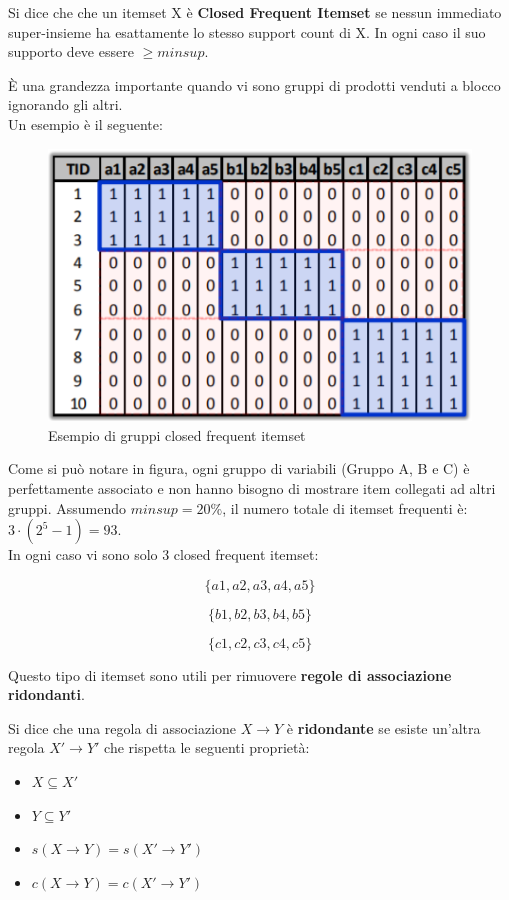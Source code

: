 \begin{defn}
	Si dice che che un itemset X è \textbf{Closed Frequent Itemset} se nessun immediato super-insieme ha esattamente lo stesso support count di X. In ogni caso il suo supporto deve essere $\ge minsup$.
\end{defn}
\`E una grandezza importante quando vi sono gruppi di prodotti venduti a blocco ignorando gli altri.
\\Un esempio è il seguente:
\begin{figure}[H]
	\centering
	\includegraphics[height=0.5 \linewidth]{association/pict/close_freq_itemset.png}
	\caption{Esempio di gruppi closed frequent itemset}
\end{figure}

Come si può notare in figura, ogni gruppo di variabili (Gruppo A, B e C) è perfettamente associato e non hanno bisogno di mostrare item collegati ad altri gruppi. Assumendo $minsup = 20\%$, il numero totale di itemset frequenti è: $3 \cdot (2^5 -1) = 93$. 
\\In ogni caso vi sono solo 3 closed frequent itemset: 

\[\{a1,a2,a3,a4,a5\}\]

\[\{b1,b2,b3,b4,b5\}\]

\[\{c1,c2,c3,c4,c5\}\]


Questo tipo di itemset sono utili per rimuovere \textbf{regole di associazione ridondanti}. 
\begin{defn}
	Si dice che una regola di associazione $X \rightarrow Y$ è \textbf{ridondante} se esiste un'altra regola $X' \rightarrow Y'$ che rispetta le seguenti proprietà: 
	\begin{itemize}
		\item $X \subseteq X'$
		\item $Y \subseteq Y'$
		\item $s(X \rightarrow Y)  = s(X' \rightarrow Y')$
		\item $c(X \rightarrow Y)  = c(X' \rightarrow Y')$
	\end{itemize}
\end{defn}

